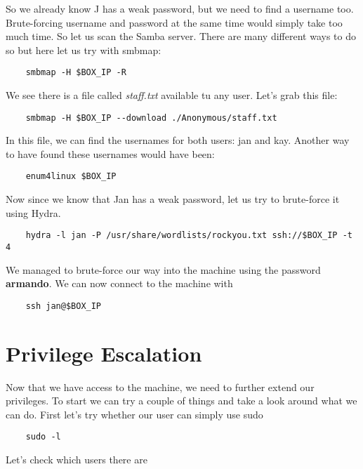\documentclass{article}
\begin{document}
\vspace{3mm}

So we already know J has a weak password, but we need to find a username too. Brute-forcing username and password at the same time would simply take too much time. So let us scan the Samba server. There are many different ways to do so but here let us try with smbmap:

\begin{lstlisting}
    smbmap -H $BOX_IP -R
\end{lstlisting}

We see there is a file called \textit{staff.txt} available tu any user. Let's grab this file:

\begin{lstlisting}
    smbmap -H $BOX_IP --download ./Anonymous/staff.txt
\end{lstlisting}
In this file, we can find the usernames for both users: jan and kay. \newline
Another way to have found these usernames would have been:

\begin{lstlisting}
    enum4linux $BOX_IP
\end{lstlisting}

Now since we know that Jan has a weak password, let us try to brute-force it using Hydra.

\begin{lstlisting}
    hydra -l jan -P /usr/share/wordlists/rockyou.txt ssh://$BOX_IP -t 4
\end{lstlisting}
We managed to brute-force our way into the machine using the password \textbf{armando}. We can now connect to the machine with

\begin{lstlisting}
    ssh jan@$BOX_IP 
\end{lstlisting}

\section*{Privilege Escalation}
Now that we have access to the machine, we need to further extend our privileges. To start we can try a couple of things and take a look around what we can do. First let's try whether our user can simply use sudo

\begin{lstlisting}
    sudo -l 
\end{lstlisting}

Let's check which users there are
\end{document}
